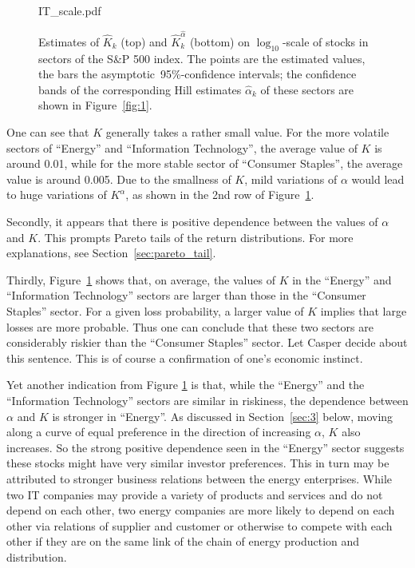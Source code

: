 \documentclass[11pt,a4]{amsart}
\newcommand{\red}{\color{darkred}}
\newcommand{\asy}{asymptotic}
\newcommand{\pro}{probabilit}
\newcommand{\1}{{\mathbf 1}}
\begin{document}
\begin{figure}[htb!]
\begin{minipage}{0.33\linewidth}
    {IT_scale.pdf}
  \end{minipage}
  \caption{\small Estimates of $\hat K_k$ (top) and $\hat K_k^{\hat
      \alpha}$ (bottom) on $\log_{10}$-scale of stocks in sectors
    of the S\&P 500 index. The points are the estimated values, the bars 
    the \asy\ 95\%-confidence intervals; the confidence bands of the
    corresponding Hill estimates $\hat \alpha_k$ of these sectors are
    shown in Figure~\ref{fig:1}. 
  }
  \label{fig:sectors_parameters}
\end{figure}
One can see that $K$ generally takes a rather small value. For the
more volatile sectors of ``Energy'' and ``Information Technology'',
the average value of $K$ is around 0.01, while for the more stable
sector of ``Consumer Staples'', the average value is around 0.005. Due
to the smallness of $K$, mild variations of $\alpha$ would lead to
huge variations of $K^\alpha$, as shown in the 2nd row of
Figure~\ref{fig:sectors_parameters}.
\par
Secondly, it appears that there is positive dependence between the  values of $\alpha$ and $K$. 
This prompts Pareto tails of the return
distributions. For more explanations, see
Section~\ref{sec:pareto_tail}.
\par
Thirdly, Figure~\ref{fig:sectors_parameters} shows that, on
average, the values of $K$
in the ``Energy'' and ``Information Technology'' sectors are  larger than those in the ``Consumer Staples'' sector. 
For a given loss \pro y, 
a larger
value of $K$ implies that large losses are more probable. Thus one can conclude that
these two sectors are considerably riskier than the ``Consumer
Staples'' sector. {\red Let Casper decide about this sentence.} This is of course a confirmation of one's economic
instinct.
\par
Yet another indication from Figure \ref{fig:sectors_parameters} is
that, while the ``Energy'' and the ``Information Technology'' sectors
are similar in riskiness, the dependence  between $\alpha$ and $K$ is
stronger in ``Energy''. As discussed in Section~\ref{sec:3} below, moving along
a curve of equal preference in the direction of increasing $\alpha$, $K$ also
increases. So the strong positive dependence seen in the ``Energy''
sector suggests these stocks might have very similar investor
preferences. This in turn may be attributed to stronger business
relations between the energy enterprises. While two IT companies
may provide a variety of products and services and do not depend on each
other, two energy companies are more likely to depend on each other
via relations of supplier and customer or otherwise to compete with each
other if they are on the same link of the chain of energy production
and distribution.
\end{document}
